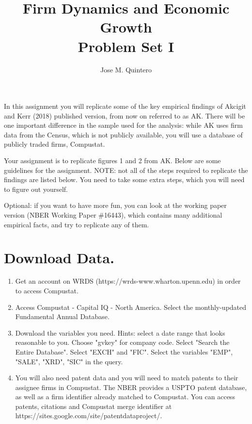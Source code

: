 \documentclass[12pt]{article}
\title{Firm Dynamics and Economic Growth \\ \large{Problem Set I}}
\author{Jose M. Quintero}
\date{ }
\begin{document}
\maketitle

In this assignment you will replicate some of the key empirical findings of Akcigit and Kerr (2018) published version, from now on referred to as AK. There will be one important difference in the sample used for the analysis: while AK uses firm data from the Census, which is not publicly available, you will use a database of publicly traded firms, Compustat.

Your assignment is to replicate figures 1 and 2 from AK. Below are some guidelines for the assignment. NOTE: not all of the steps required to replicate the findings are listed below. You need to take some extra steps, which you will need to figure out yourself.

Optional: if you want to have more fun, you can look at the working paper version (NBER Working Paper \#16443), which contains many additional empirical facts, and try to replicate any of them.

\section{Download Data.}

\begin{enumerate}[leftmargin=0pt, label=\textbf{(\alph*)}]

\item Get an account on WRDS (https://wrds-www.wharton.upenn.edu) in order to access Compustat.

\item Access Compustat - Capital IQ - North America. Select the monthly-updated Fundamental Annual Database.

\item Download the variables you need. Hints: select a date range that looks reasonable to you. Choose "gvkey" for company code. Select "Search the Entire Database". Select "EXCH" and "FIC". Select the variables "EMP", "SALE", "XRD", "SIC" in the query.

\item You will also need patent data and you will need to match patents to their assignee firms in Compustat. The NBER provides a USPTO patent database, as well as a firm identifier already matched to Compustat. You can access patents, citations and Compustat merge identifier at https://sites.google.com/site/patentdataproject/.

\end{enumerate}
\end{document}
